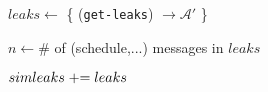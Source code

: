 \begin{bbox}[title={Algorithm $\msf{SimGetLeaks}$}]
	
	\begin{renumerate}
		\item $leaks \leftarrow$ \{ \Send (\texttt{get-leaks}) $\rightarrow \mathcal{\mathcal{A}'}$ \}
		\item $n \leftarrow \#$ of (schedule,...) messages in $leaks$
		\item $simleaks \mathrel{+}= leaks$
	\end{renumerate}

\end{bbox}

